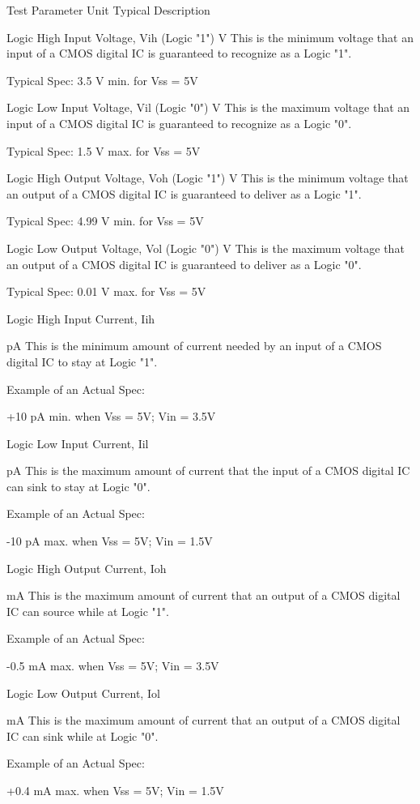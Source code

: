 Test Parameter
 Unit Typical Description



Logic High Input Voltage, Vih (Logic "1")
 V This is the minimum voltage that an input of a CMOS digital IC is guaranteed to recognize as a Logic "1".

Typical Spec: 3.5 V min. for Vss = 5V





Logic Low Input Voltage, Vil (Logic "0")
 V This is the maximum voltage that an input of a CMOS digital IC is guaranteed to recognize as a Logic "0".

Typical Spec: 1.5 V max. for Vss = 5V





Logic High Output Voltage, Voh (Logic "1")
 V This is the minimum voltage that an output of a CMOS digital IC is guaranteed to deliver as a Logic "1".

Typical Spec: 4.99 V min. for Vss = 5V





Logic Low Output Voltage, Vol (Logic "0")
 V This is the maximum voltage that an output of a CMOS digital IC is guaranteed to deliver as a Logic "0".

Typical Spec: 0.01 V max. for Vss = 5V




Logic High Input Current, Iih


 pA This is the minimum amount of current needed by an input of a CMOS digital IC to stay at Logic "1".

Example of an Actual Spec:

+10 pA min. when Vss = 5V; Vin = 3.5V





Logic Low Input Current, Iil


 pA This is the maximum amount of current that the input of a CMOS digital IC can sink to stay at Logic "0".

Example of an Actual Spec:

-10 pA max. when Vss = 5V; Vin = 1.5V




Logic High Output Current, Ioh


 mA This is the maximum amount of current that an output of a CMOS digital IC can source while at Logic "1".

Example of an Actual Spec:

-0.5 mA max. when Vss = 5V; Vin = 3.5V





Logic Low Output Current, Iol


 mA This is the maximum amount of current that an output of a CMOS digital IC can sink while at Logic "0".

Example of an Actual Spec:

+0.4 mA max. when Vss = 5V; Vin = 1.5V





